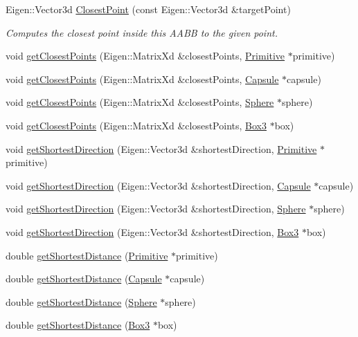 \begin{DoxyCompactItemize}
Eigen\+::\+Vector3d \hyperlink{class_box3_a4e348447918fb2af753b3db5f162de37}{Closest\+Point} (const Eigen\+::\+Vector3d \&target\+Point)
\begin{DoxyCompactList}\small\item\em Computes the closest point inside this A\+A\+BB to the given point. \end{DoxyCompactList}\item 
void \hyperlink{class_box3_a19facb9f58656715206d50e0a1ef0527}{get\+Closest\+Points} (Eigen\+::\+Matrix\+Xd \&closest\+Points, \hyperlink{class_primitive}{Primitive} $\ast$primitive)
\item 
void \hyperlink{class_box3_a3d389f14454f38310d2a77212c112957}{get\+Closest\+Points} (Eigen\+::\+Matrix\+Xd \&closest\+Points, \hyperlink{class_capsule}{Capsule} $\ast$capsule)
\item 
void \hyperlink{class_box3_a538b1b04d58f58478b7094dcc4d91e3e}{get\+Closest\+Points} (Eigen\+::\+Matrix\+Xd \&closest\+Points, \hyperlink{class_sphere}{Sphere} $\ast$sphere)
\item 
void \hyperlink{class_box3_a298425cb241cb0f0194316e4d25aafe4}{get\+Closest\+Points} (Eigen\+::\+Matrix\+Xd \&closest\+Points, \hyperlink{class_box3}{Box3} $\ast$box)
\item 
void \hyperlink{class_box3_a52abf43c224fa75af10dc146920fd4fd}{get\+Shortest\+Direction} (Eigen\+::\+Vector3d \&shortest\+Direction, \hyperlink{class_primitive}{Primitive} $\ast$primitive)
\item 
void \hyperlink{class_box3_a2e7de5b181e49c49232d494340ed0415}{get\+Shortest\+Direction} (Eigen\+::\+Vector3d \&shortest\+Direction, \hyperlink{class_capsule}{Capsule} $\ast$capsule)
\item 
void \hyperlink{class_box3_a033c3685ad82e29c8e26b921d0334ecd}{get\+Shortest\+Direction} (Eigen\+::\+Vector3d \&shortest\+Direction, \hyperlink{class_sphere}{Sphere} $\ast$sphere)
\item 
void \hyperlink{class_box3_abd93d14e07b6d985543bd20a7aa322f9}{get\+Shortest\+Direction} (Eigen\+::\+Vector3d \&shortest\+Direction, \hyperlink{class_box3}{Box3} $\ast$box)
\item 
double \hyperlink{class_box3_a6e3b4ac3d13e84b77f616e682d40762d}{get\+Shortest\+Distance} (\hyperlink{class_primitive}{Primitive} $\ast$primitive)
\item 
double \hyperlink{class_box3_ae02730af56a2c60295513122afbc2150}{get\+Shortest\+Distance} (\hyperlink{class_capsule}{Capsule} $\ast$capsule)
\item 
double \hyperlink{class_box3_a37f0dedde1849d2c6ab61468c81ae32d}{get\+Shortest\+Distance} (\hyperlink{class_sphere}{Sphere} $\ast$sphere)
\item 
double \hyperlink{class_box3_a5c009c518b97e950820513914d12d16a}{get\+Shortest\+Distance} (\hyperlink{class_box3}{Box3} $\ast$box)
\end{DoxyCompactItemize}
